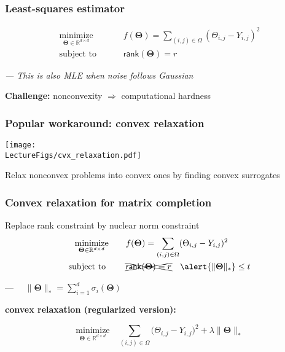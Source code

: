 \documentclass[compress,
mathserif,wide,%
]{beamer}
\begin{document}
\begin{frame}
  \frametitle{Least-squares estimator}
  \begin{align*}
    \underset{\bm{\Theta}\in \mathbb{R}^{d \times d}}{\text{minimize}} \qquad &f(\bm{\Theta})=  \sum_{(i,j)\in\Omega} ( \Theta_{i,j} - Y_{i,j} )^{2} \\
    \text{subject to } \qquad &\mathsf{rank}(\bm{\Theta}) = r
  \end{align*}

\pause
  {\hfill \footnotesize \em --- This is also MLE when noise follows Gaussian}

  \pause
  {
\vfill
\vspace{1em}

\begin{varblock}[\textwidth]{}
\centering
   \alert{{\bf Challenge: }}  nonconvexity $\Longrightarrow$ computational hardness
\end{varblock}
}
\end{frame}




\begin{frame}
  \frametitle{Popular workaround: convex relaxation}
  
  
  \begin{center}
    \texttt{[image: \\LectureFigs/cvx\_relaxation.pdf]}
  \end{center}
  
  \vfill
  Relax nonconvex problems into convex ones by finding convex surrogates
  

\end{frame}

\begin{frame}
  \frametitle{Convex relaxation for matrix completion}
  Replace rank constraint by nuclear norm constraint
    \begin{align*}
    \underset{\bm{\Theta}\in \mathbb{R}^{d \times d}}{\text{minimize}} \qquad &f(\bm{\Theta})=  \sum_{(i,j)\in\Omega} ( \Theta_{i,j} - Y_{i,j} )^{2} \\
    \text{subject to } \qquad &\xcancel{\mathsf{rank}(\bm{\Theta}) = r} \quad \alert{\|\bm{\Theta}\|_{*}} \leq t
  \end{align*}

  {\hfill \footnotesize ---~~ $\|\bm{\Theta}\|_* = \sum_{i=1}^{d} \sigma_{i}(\bm{\Theta})$  }

\vfill

\pause
  {

\begin{varblock}[\textwidth]{}
\textbf{convex relaxation (regularized version):}
  \vspace{-2em}
\begin{center}
\[
   \underset{\bm{\Theta}\in\mathbb{R}^{d\times d}}{\text{minimize}}\quad  \sum_{(i,j)\in\Omega}\big(\Theta_{i,j}-Y_{i,j}\big)^{2}  +\lambda{\|\bm{\Theta}\|_{*}}
\]  
\end{center}
\end{varblock}
}
\end{frame}
\end{document}
